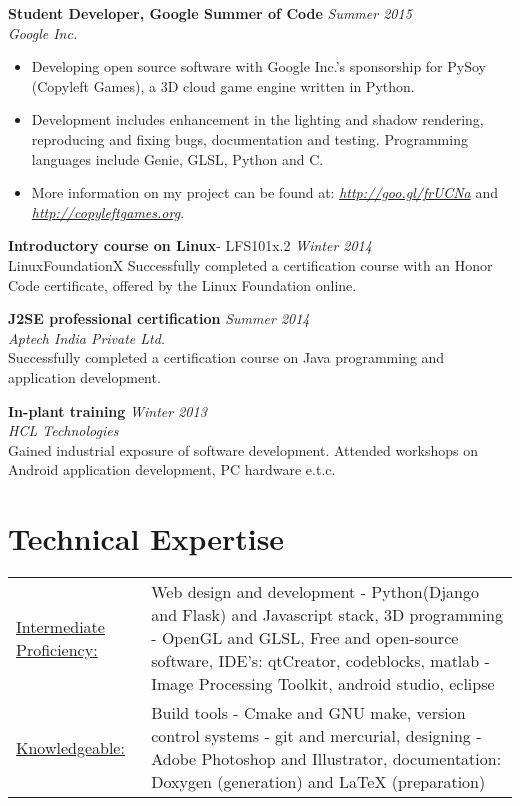 \documentclass[margin]{res}
\begin{document}
\begin{resume}
	{\bf Student Developer, Google Summer of Code} \hfill {\sl Summer 2015}
	\\{\sl Google Inc.}
	\begin{itemize}
	\item Developing open source software with Google Inc.’s sponsorship for PySoy (Copyleft Games), a 3D cloud game engine written in Python.
 \item Development includes enhancement in the lighting and shadow rendering, reproducing and fixing bugs, documentation and testing. Programming languages include Genie, GLSL, Python and C. 
	\item More information on my project can be found at: {\sl \underline{http://goo.gl/frUCNa}} and {\sl \underline{http://copyleftgames.org}}.
	\end{itemize}
 {\bf Introductory course on Linux}- LFS101x.2 {\sl \hfill Winter 2014}
	\\LinuxFoundationX
	Successfully completed a certification course with an Honor Code certificate, offered by the Linux Foundation online.
	
	{\bf J2SE professional certification} {\sl \hfill Summer 2014 }
	\\{\sl Aptech India Private Ltd.}
	\\Successfully completed a certification course on Java programming and application development.

 {\bf In-plant training} {\sl \hfill Winter 2013} 
 \\{\sl HCL Technologies}
 \\Gained industrial exposure of software development. Attended workshops on Android application development, PC hardware e.t.c.

\section{Technical Expertise}

\begin{tabular}{l p{3.5in}}
    \underline{Intermediate Proficiency:} & Web design and development - Python(Django and Flask) and Javascript stack, 3D programming - OpenGL and GLSL, Free and open-source software, IDE's: qtCreator, codeblocks, matlab - Image Processing Toolkit, android studio, eclipse\\
		
		\underline{Knowledgeable:} & Build tools - Cmake and GNU make, version control systems - git and mercurial, designing - Adobe Photoshop and Illustrator, documentation: Doxygen (generation) and LaTeX (preparation)
  \end{tabular}
	\\\\

\end{resume}
\end{document}
